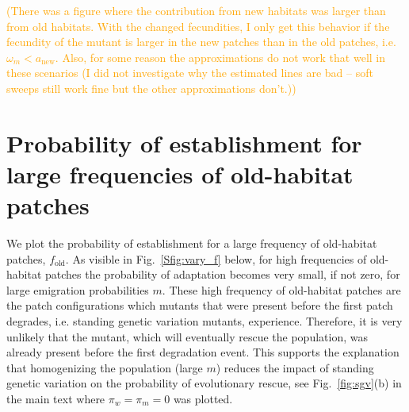 \documentclass[a4paper,11pt]{scrartcl}
\newcommand{\pete}[1]{\textcolor{orange}{(#1)}}
\newcommand{\chg}[1]{\textcolor{change}{#1}}
\begin{document}

\pete{There was a figure where the contribution from new habitats was larger than from old habitats. With the changed fecundities, I only get this behavior if the fecundity of the mutant is larger in the new patches than in the old patches, i.e. $\omega_m < a_{\text{new}}$. Also, for some reason the approximations do not work that well in these scenarios (I did not investigate why the estimated lines are bad -- soft sweeps still work fine but the other approximations don't.)}

\newpage
\section{Probability of establishment for large frequencies of old-habitat patches}
\chg{We plot the probability of establishment for a large frequency of old-habitat patches, $f_{\text{old}}$. As visible in Fig.~\ref{Sfig:vary_f} below, for high frequencies of old-habitat patches the probability of adaptation becomes very small, if not zero, for large emigration probabilities $m$. These high frequency of old-habitat patches are the patch configurations which mutants that were present before the first patch degrades, i.e. standing genetic variation mutants, experience. Therefore, it is very unlikely that the mutant, which will eventually rescue the population, was already present before the first degradation event.} This supports the explanation that homogenizing the population (large $m$) reduces the impact of standing genetic variation on the probability of evolutionary rescue, see Fig.~\ref{fig:sgv}(b) in the main text where $\pi_w=\pi_m=0$ was plotted.
\end{document}
